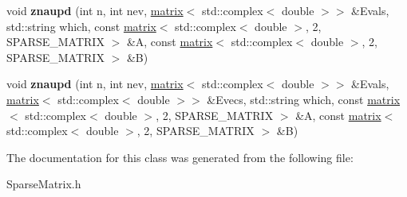 \begin{DoxyCompactItemize}
\item 
\hypertarget{classkeycpp_1_1matrix_3_01_t_00_012_00_01_s_p_a_r_s_e___m_a_t_r_i_x_01_4_a7cfd9ddb291c08f9f4411a72ddcdb711}{void {\bfseries znaupd} (int n, int nev, \hyperlink{classkeycpp_1_1matrix}{matrix}$<$ std\-::complex$<$ double $>$$>$ \&Evals, std\-::string which, const \hyperlink{classkeycpp_1_1matrix}{matrix}$<$ std\-::complex$<$ double $>$, 2, S\-P\-A\-R\-S\-E\-\_\-\-M\-A\-T\-R\-I\-X $>$ \&A, const \hyperlink{classkeycpp_1_1matrix}{matrix}$<$ std\-::complex$<$ double $>$, 2, S\-P\-A\-R\-S\-E\-\_\-\-M\-A\-T\-R\-I\-X $>$ \&B)}\label{classkeycpp_1_1matrix_3_01_t_00_012_00_01_s_p_a_r_s_e___m_a_t_r_i_x_01_4_a7cfd9ddb291c08f9f4411a72ddcdb711}

\item 
\hypertarget{classkeycpp_1_1matrix_3_01_t_00_012_00_01_s_p_a_r_s_e___m_a_t_r_i_x_01_4_aaa77b1b34bb61284329d31247adadfd0}{void {\bfseries znaupd} (int n, int nev, \hyperlink{classkeycpp_1_1matrix}{matrix}$<$ std\-::complex$<$ double $>$$>$ \&Evals, \hyperlink{classkeycpp_1_1matrix}{matrix}$<$ std\-::complex$<$ double $>$$>$ \&Evecs, std\-::string which, const \hyperlink{classkeycpp_1_1matrix}{matrix}$<$ std\-::complex$<$ double $>$, 2, S\-P\-A\-R\-S\-E\-\_\-\-M\-A\-T\-R\-I\-X $>$ \&A, const \hyperlink{classkeycpp_1_1matrix}{matrix}$<$ std\-::complex$<$ double $>$, 2, S\-P\-A\-R\-S\-E\-\_\-\-M\-A\-T\-R\-I\-X $>$ \&B)}\label{classkeycpp_1_1matrix_3_01_t_00_012_00_01_s_p_a_r_s_e___m_a_t_r_i_x_01_4_aaa77b1b34bb61284329d31247adadfd0}

\end{DoxyCompactItemize}


The documentation for this class was generated from the following file\-:\begin{DoxyCompactItemize}
\item 
Sparse\-Matrix.\-h\end{DoxyCompactItemize}
